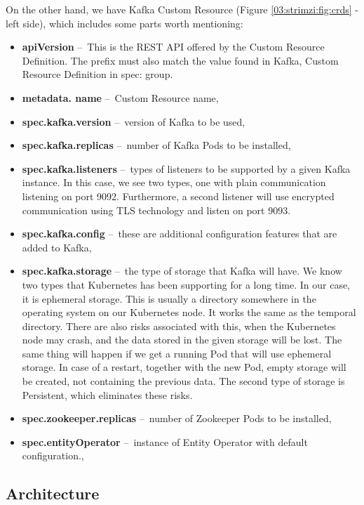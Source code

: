 On the other hand, we have Kafka Custom Resource (Figure \ref{03:strimzi:fig:crds} - left side), which includes some parts worth mentioning:
\begin{itemize}[itemsep=1mm, parsep=0pt]
  \item \textbf{apiVersion} \---\ This is the REST API offered by the Custom Resource Definition. The prefix must also match the value found in Kafka, Custom Resource Definition in spec: group. 
  \item \textbf{metadata. name} \---\ Custom Resource name,
  \item \textbf{spec.kafka.version} \---\ version of Kafka to be used,
  \item \textbf{spec.kafka.replicas} \---\ number of Kafka Pods to be installed,
  \item \textbf{spec.kafka.listeners} \---\ types of listeners to be supported by a given Kafka instance. In this case, we see two types, one with plain communication listening on port 9092. Furthermore, a second listener will use encrypted communication using TLS technology and listen on port 9093.
  \item  \textbf{spec.kafka.config} \---\ these are additional configuration features that are added to Kafka,
  \item  \textbf{spec.kafka.storage} \cite{strimziStorageBlogPost} \---\ the type of storage that Kafka will have. We know two types that Kubernetes has been supporting for a long time. In our case, it is ephemeral storage. This is usually a directory somewhere in the operating system on our Kubernetes node. It works the same as the temporal directory. There are also risks associated with this, when the Kubernetes node may crash, and the data stored in the given storage will be lost. The same thing will happen if we get a running Pod that will use ephemeral storage. In case of a restart, together with the new Pod, empty storage will be created, not containing the previous data. The second type of storage is Persistent, which eliminates these risks.
  \item \textbf{spec.zookeeper.replicas} \---\ number of Zookeeper Pods to be installed,
  \item \textbf{spec.entityOperator} \---\ instance of Entity Operator with default configuration.,
\end{itemize}

\subsection{Architecture}

